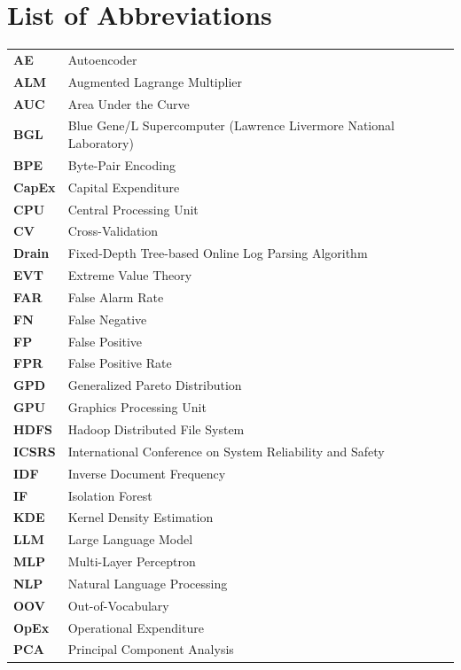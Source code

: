 \chapter*{List of Abbreviations}

\begin{tabular}{ll}
\textbf{AE} & Autoencoder \\
\textbf{ALM} & Augmented Lagrange Multiplier \\
\textbf{AUC} & Area Under the Curve \\
\textbf{BGL} & Blue Gene/L Supercomputer (Lawrence Livermore National Laboratory) \\
\textbf{BPE} & Byte-Pair Encoding \\
\textbf{CapEx} & Capital Expenditure \\
\textbf{CPU} & Central Processing Unit \\
\textbf{CV} & Cross-Validation \\
\textbf{Drain} & Fixed-Depth Tree-based Online Log Parsing Algorithm \\
\textbf{EVT} & Extreme Value Theory \\
\textbf{FAR} & False Alarm Rate \\
\textbf{FN} & False Negative \\
\textbf{FP} & False Positive \\
\textbf{FPR} & False Positive Rate \\
\textbf{GPD} & Generalized Pareto Distribution \\
\textbf{GPU} & Graphics Processing Unit \\
\textbf{HDFS} & Hadoop Distributed File System \\
\textbf{ICSRS} & International Conference on System Reliability and Safety \\
\textbf{IDF} & Inverse Document Frequency \\
\textbf{IF} & Isolation Forest \\
\textbf{KDE} & Kernel Density Estimation \\
\textbf{LLM} & Large Language Model \\
\textbf{MLP} & Multi-Layer Perceptron \\
\textbf{NLP} & Natural Language Processing \\
\textbf{OOV} & Out-of-Vocabulary \\
\textbf{OpEx} & Operational Expenditure \\
\textbf{PCA} & Principal Component Analysis \\

\end{tabular}
